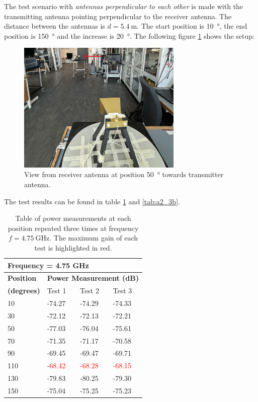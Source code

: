 The test scenario with \textit{antennas perpendicular to each other} is made with the transmitting antenna pointing perpendicular to the receiver antenna. The distance between the antennas is $d=\SI{5.4}{\meter}$. The start position is \SI{10}{\degree}, the end position is \SI{150}{\degree} and the increase is \SI{20}{\degree}. The following figure \ref{fig:a2_3} shows the setup:
\begin{figure}[H]
    \centering
    \includegraphics[width=0.7\textwidth]{figures/test_los_perpendicular.JPG}
    \caption{View from receiver antenna at position \SI{50}{\degree} towards transmitter antenna.} \label{fig:a2_3}
\end{figure}

The test results can be found in table \ref{tab:a2_3a} and \ref{tab:a2_3b}.
\begin{table}[H]
    \centering
    \begin{tabular}{l|l|l|l}
        \multicolumn{4}{l}{\textbf{Frequency = 4.75 GHz}}         \\
        \hline
        \textbf{Position} & \multicolumn{3}{l}{\textbf{Power Measurement (dB)}} \\
        \textbf{(degrees)}  & Test 1    & Test 2  & Test 3  \\
        \hline
        \hline
        10      & -74.27    & -74.29    & -74.33 \\
        30      & -72.12    & -72.13    & -72.21 \\
        50      & -77.03    & -76.04    & -75.61 \\
        70      & -71.35    & -71.17    & -70.58 \\
        90      & -69.45    & -69.47    & -69.71 \\
        110     & \textcolor{red}{-68.42}    & \textcolor{red}{-68.28}    & \textcolor{red}{-68.15} \\
        130     & -79.83    & -80.25    & -79.30 \\
        150     & -75.04    & -75.25    & -75.23
        \end{tabular}
    \caption{Table of power measurements at each position repeated three times at frequency $f=\SI{4.75}{\giga\hertz}$. The maximum gain of each test is highlighted in red.}
    \label{tab:a2_3a}
\end{table}

